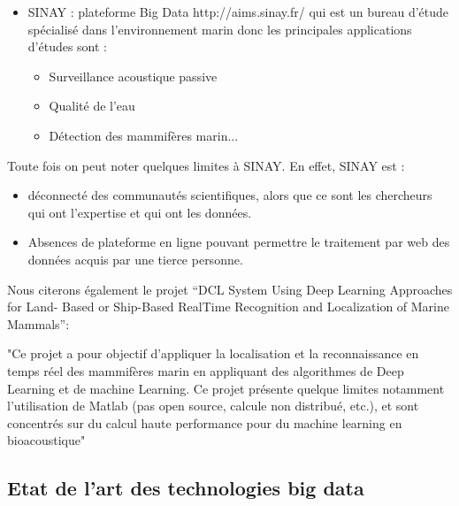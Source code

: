 \documentclass[a4paper]{article}
\begin{document}
\begin{itemize}

	\item SINAY : plateforme Big Data http://aims.sinay.fr/ qui est un bureau d’étude spécialisé dans
	      l’environnement marin donc les principales applications d’études sont :

	      \begin{itemize}

		      \item Surveillance acoustique passive

		      \item Qualité de l’eau

		      \item Détection des mammifères marin...

	      \end{itemize}

\end{itemize}

Toute fois on peut noter quelques limites à SINAY. En effet, SINAY est :
\begin{itemize}
	\item déconnecté des communautés scientifiques, alors que ce sont les chercheurs qui ont l’expertise et qui ont les données.

	\item Absences de plateforme en ligne pouvant permettre le traitement par web des données acquis
	      par une tierce personne.
\end{itemize}

Nous citerons également le projet “DCL System Using Deep Learning Approaches for Land-
Based or Ship-Based RealTime Recognition and Localization of Marine Mammals”:


"Ce projet a pour objectif d’appliquer la localisation et la reconnaissance en temps réel des
mammifères marin en appliquant des algorithmes de Deep Learning et de machine Learning.
Ce projet présente quelque limites notamment l’utilisation de Matlab (pas open source, calcule
non distribué, etc.), et sont concentrés sur du calcul haute performance pour du machine
learning en bioacoustique"

\subsection{Etat de l’art des technologies big data}
\end{document}

